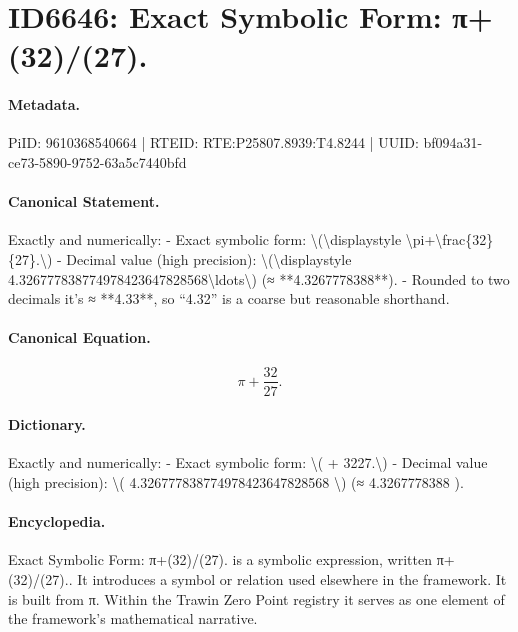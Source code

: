 \section*{ID6646: Exact Symbolic Form: π+(32)/(27).}
\paragraph{Metadata.}
PiID: 9610368540664 | RTEID: RTE:P25807.8939:T4.8244 | UUID: bf094a31-ce73-5890-9752-63a5c7440bfd

\paragraph{Canonical Statement.}
Exactly and numerically: - Exact symbolic form: \textbackslash{}(\textbackslash{}displaystyle \textbackslash{}pi+\textbackslash{}frac\{32\}\{27\}.\textbackslash{}) - Decimal value (high precision): \textbackslash{}(\textbackslash{}displaystyle 4.326777838774978423647828568\textbackslash{}ldots\textbackslash{}) (≈ **4.3267778388**). - Rounded to two decimals it’s ≈ **4.33**, so “4.32” is a coarse but reasonable shorthand.

\paragraph{Canonical Equation.}
\[
\displaystyle \pi+\frac{32}{27}.
\]

\paragraph{Dictionary.}
Exactly and numerically: - Exact symbolic form: \textbackslash{}( + 3227.\textbackslash{}) - Decimal value (high precision): \textbackslash{}( 4.326777838774978423647828568 \textbackslash{}) (≈ 4.3267778388 ).

\paragraph{Encyclopedia.}
Exact Symbolic Form: π+(32)/(27). is a symbolic expression, written π+(32)/(27).. It introduces a symbol or relation used elsewhere in the framework. It is built from π. Within the Trawin Zero Point registry it serves as one element of the framework's mathematical narrative.
